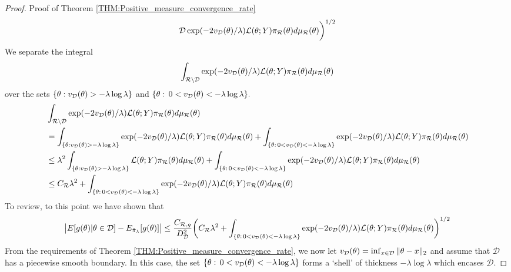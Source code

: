 \documentclass[10pt,fleqn]{article} \pdfoutput=1
\DeclareMathOperator{\1}{\mathbbm{1}} \DeclareMathOperator{\bigO}{\mc O}
\begin{document}
\begin{proof}{Proof of Theorem \ref{THM:Positive_measure_convergence_rate}}
\begin{align*}
{			\mathcal{D}}\exp(-2v_{\mathcal{D}}(\theta)/\lambda
		)\mathcal{L}(\theta;Y)\pi_\mathcal{R}(\theta)
		d\mu_\mathcal{R}(\theta)\bigg)^{1/2}\end{align*} We separate the integral
	$$\int_{\mathcal{R}\setminus \mathcal{D}}\exp(-2v_{\mathcal{D}}(\theta)/\lambda
		)\mathcal{L}(\theta;Y)\pi_\mathcal{R}(\theta) d\mu_\mathcal{R}(\theta)$$
	over the sets $\{\theta: v_{\mathcal{D}}(\theta)> -\lambda\log\lambda\}$ and $\{\theta:
		\, 0< v_{\mathcal{D}}(\theta)< -\lambda\log\lambda\}.$ \begin{align*}
		 & \int_{\mathcal{R}\setminus \mathcal{D}}\exp(-2v_{\mathcal{D}}(\theta)/\lambda
		)\mathcal{L}(\theta;Y)\pi_\mathcal{R}(\theta)
		d\mu_\mathcal{R}(\theta)                                             \\ &= \int_{\{\theta: v_{\mathcal{D}}(\theta)>
			-\lambda\log\lambda\}}\exp(-2v_{\mathcal{D}}(\theta)/\lambda
		)\mathcal{L}(\theta;Y)\pi_\mathcal{R}(\theta)
		d\mu_\mathcal{R}(\theta) +\int_{\{\theta: \,0 < v_{\mathcal{D}}(\theta)<
			-\lambda\log\lambda\}}\exp(-2v_{\mathcal{D}}(\theta)/\lambda
		)\mathcal{L}(\theta;Y)\pi_\mathcal{R}(\theta)
		d\mu_\mathcal{R}(\theta)                                             \\ &\le \lambda^2 \int_{\{\theta:
			v_{\mathcal{D}}(\theta)>
			-\lambda\log\lambda\}}\mathcal{L}(\theta;Y)\pi_\mathcal{R}(\theta)
		d\mu_\mathcal{R}(\theta)+\int_{\{\theta: \,0< v_{\mathcal{D}}(\theta)<
			-\lambda\log\lambda\}}\exp(-2v_{\mathcal{D}}(\theta)/\lambda
		)\mathcal{L}(\theta;Y)\pi_\mathcal{R}(\theta)
		d\mu_\mathcal{R}(\theta)                                             \\ &\le C_\mathcal{R}\lambda^2
		+\int_{\{\theta: \, 0< v_{\mathcal{D}}(\theta)<
			-\lambda\log\lambda\}}\exp(-2v_{\mathcal{D}}(\theta)/\lambda
		)\mathcal{L}(\theta;Y)\pi_\mathcal{R}(\theta) d\mu_\mathcal{R}(\theta)
	\end{align*} To review, to this point we have shown that \begin{equation}
		\big|
		E[g(\theta)|\theta\in\mathcal{D}]-E_{\tilde{\pi}_\lambda}[g(\theta)]\big|
		\le
		\frac{C_{\mathcal{R},g}}{D_\mathcal{D}^2}\bigg(C_\mathcal{R}\lambda^2
		+ \int_{\{\theta: \, 0< v_{\mathcal{D}}(\theta)<
			-\lambda\log\lambda\}}\exp(-2v_{\mathcal{D}}(\theta)/\lambda
		)\mathcal{L}(\theta;Y)\pi_\mathcal{R}(\theta) d\mu_\mathcal{R}(\theta)
		\bigg)^{1/2} \end{equation} From the requirements of Theorem
	\ref{THM:Positive_measure_convergence_rate}, we now let $v_{\mathcal{D}}(\theta) =
		\inf_{x\in \mathcal{D}}\|\theta - x\|_2$ and assume that $\mathcal{D}$ has
	a piecewise smooth boundary.  In this case, the set $\{\theta: \,0 <
		v_{\mathcal{D}}(\theta)< -\lambda\log\lambda\}$ forms a `shell' of thickness $-\lambda
		\log \lambda$ which encases $\mathcal{D}.$


\end{proof}
\end{document}
